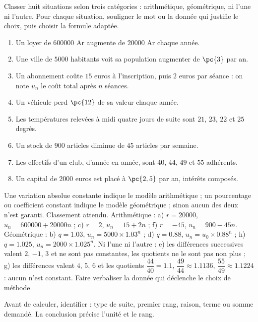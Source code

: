 \begin{activity}
Classer huit situations selon trois catégories : arithmétique, géométrique, ni l'une ni l'autre. Pour chaque situation, souligner le mot ou la donnée qui justifie le choix, puis choisir la formule adaptée.
\begin{enumerate}[label=\alph*)]
\item Un loyer de $\num{600000}$ Ar augmente de $\num{20000}$ Ar chaque année.
\item Une ville de $\num{5000}$ habitants voit sa population augmenter de $\pc{3}$ par an.
\item Un abonnement coûte $15$ euros à l'inscription, puis $2$ euros par séance : on note $u_n$ le coût total après $n$ séances.
\item Un véhicule perd $\pc{12}$ de sa valeur chaque année.
\item Les températures relevées à midi quatre jours de suite sont $21$, $23$, $22$ et $25$ degrés.
\item Un stock de $900$ articles diminue de $45$ articles par semaine.
\item Les effectifs d'un club, d'année en année, sont $40$, $44$, $49$ et $55$ adhérents.
\item Un capital de $\num{2000}$ euros est placé à $\pc{2,5}$ par an, intérêts composés.
\end{enumerate}

\end{activity}
\begin{solution}Une variation absolue constante indique le modèle arithmétique ; un pourcentage ou coefficient constant indique le modèle géométrique ; sinon aucun des deux n'est garanti. Classement attendu. Arithmétique : a) $r=\num{20000}$, $u_n=\num{600000}+\num{20000}n$ ; c) $r=2$, $u_n=15+2n$ ; f) $r=-45$, $u_n=900-45n$. Géométrique : b) $q=\num{1,03}$, $u_n=\num{5000}\times\num{1,03}^n$ ; d) $q=\num{0,88}$, $u_n=u_0\times\num{0,88}^n$ ; h) $q=\num{1,025}$, $u_n=\num{2000}\times\num{1,025}^n$. Ni l'une ni l'autre : e) les différences successives valent $2$, $-1$, $3$ et ne sont pas constantes, les quotients ne le sont pas non plus ; g) les différences valent $4$, $5$, $6$ et les quotients $\dfrac{44}{40}=\num{1,1}$, $\dfrac{49}{44}\approx\num{1,1136}$, $\dfrac{55}{49}\approx\num{1,1224}$ : aucun n'est constant. Faire verbaliser la donnée qui déclenche le choix de méthode.\end{solution}

\begin{summary}Avant de calculer, identifier : type de suite, premier rang, raison, terme ou somme demandé. La conclusion précise l'unité et le rang.\end{summary}

